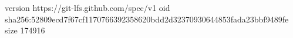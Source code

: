 version https://git-lfs.github.com/spec/v1
oid sha256:52809ecd7f67cf1170766392358620bdd2d32370930644853fada23bbf9489fe
size 174916
